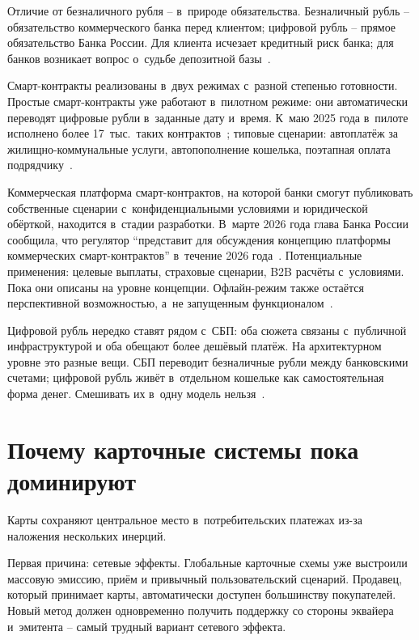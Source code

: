 Отличие от безналичного рубля -- в~природе обязательства. Безналичный
рубль -- обязательство коммерческого банка перед клиентом; цифровой
рубль -- прямое обязательство Банка России. Для клиента
исчезает кредитный риск банка; для банков возникает вопрос
о~судьбе депозитной базы~\cite{cbr-digital-ruble}.

Смарт-контракты реализованы в~двух режимах с~разной степенью готовности.
Простые смарт-контракты уже работают в~пилотном режиме: они автоматически
переводят цифровые рубли в~заданные дату и~время.
К~маю 2025 года в~пилоте исполнено более 17~тыс.\ таких контрактов~\cite{cbr-digital-ruble}; типовые сценарии: автоплатёж за
жилищно-коммунальные услуги, автопополнение кошелька, поэтапная оплата
подрядчику~\cite{gazprombank-smart-contracts-2025}.

Коммерческая платформа смарт-контрактов, на которой банки смогут
публиковать собственные сценарии с~конфиденциальными условиями и
юридической обёрткой, находится в~стадии разработки. В~марте 2026 года
глава Банка России сообщила, что регулятор \enquote{представит для
обсуждения концепцию платформы коммерческих смарт-контрактов} в~течение
2026 года~\cite{cbr-nabiullina-abr-2026}.
Потенциальные применения: целевые выплаты, страховые сценарии, B2B
расчёты с~условиями. Пока они описаны на уровне концепции. Офлайн-режим
также остаётся перспективной возможностью, а~не запущенным функционалом~\cite{cbr-digital-ruble}.

Цифровой рубль нередко ставят рядом с~СБП: оба сюжета
связаны с~публичной инфраструктурой и оба обещают более дешёвый
платёж. На архитектурном уровне это разные вещи. СБП переводит
безналичные рубли между банковскими счетами; цифровой рубль
живёт в~отдельном кошельке как самостоятельная форма денег. Смешивать их
в~одну модель нельзя~\cite{cbr-digital-ruble}.

\section{Почему карточные системы пока доминируют}\label{sec:alt-card-dominance}

Карты сохраняют центральное место в~потребительских платежах из-за
наложения нескольких инерций.

Первая причина: сетевые эффекты. Глобальные карточные схемы уже
выстроили массовую эмиссию, приём и привычный пользовательский сценарий.
Продавец, который принимает карты, автоматически доступен большинству
покупателей. Новый метод должен одновременно получить поддержку
со стороны эквайера и~эмитента -- самый трудный вариант сетевого
эффекта.

